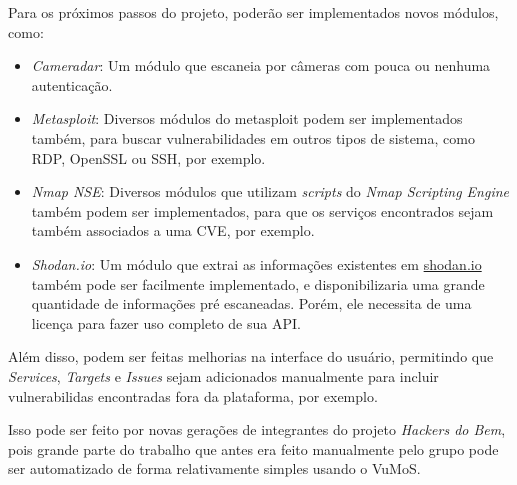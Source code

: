 Para os próximos passos do projeto, poderão ser implementados novos módulos, como:
\begin{itemize}
    \item \emph{Cameradar}: Um módulo que escaneia por câmeras com pouca ou nenhuma autenticação.
    \item \emph{Metasploit}: Diversos módulos do metasploit podem ser implementados também, para buscar vulnerabilidades em outros tipos de sistema, como RDP, OpenSSL ou SSH, por exemplo.
    \item \emph{Nmap NSE}: Diversos módulos que utilizam \textit{scripts} do \textit{Nmap Scripting Engine} também podem ser implementados, para que os serviços encontrados sejam também associados a uma CVE, por exemplo.
    \item \emph{Shodan.io}: Um módulo que extrai as informações existentes em \url{shodan.io} também pode ser facilmente implementado, e disponibilizaria uma grande quantidade de informações pré escaneadas. Porém, ele necessita de uma licença para fazer uso completo de sua API.
\end{itemize}

Além disso, podem ser feitas melhorias na interface do usuário, permitindo que \textit{Services}, \textit{Targets} e \textit{Issues} sejam adicionados manualmente para incluir vulnerabilidas encontradas fora da plataforma, por exemplo. 

Isso pode ser feito por novas gerações de integrantes do projeto \textit{Hackers do Bem}, pois grande parte do trabalho que antes era feito manualmente pelo grupo pode ser automatizado de forma relativamente simples usando o VuMoS.